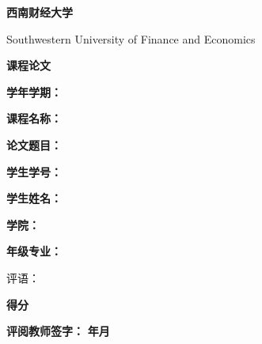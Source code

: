 \documentclass{ctexart}
\newcommand{\hwxw}{\CJKfamily{hwxw}}
\begin{document}
    \thispagestyle{empty}
    \begin{center}
        {\bfseries\hwxw 西南财经大学}

        {\BrushScriptMT Southwestern University of Finance and Economics}

        {\bfseries\heiti 课程论文}

        {\fangsong{}
            \textbf{学年学期：}\uline{\hspace{1em}\hfill} \makebox[0.46em]{}\par
            \textbf{课程名称：}\uline{\hspace{1em}\hfill} \makebox[0.46em]{}\par
            \textbf{论文题目：}\uline{\hspace{1em}\hfill} \makebox[0.46em]{}\par
            \textbf{学生学号：}\uline{\hspace{1em}\hfill} \makebox[0.46em]{}\par
            \textbf{学生姓名：}\uline{\hspace{1em}\hfill} \makebox[0.46em]{}\par
            \textbf{学\hspace{2em}院：}\uline{\hspace{1em}\hfill} \makebox[0.46em]{}\par
            \textbf{年级专业：}\uline{\hspace{1em}\hfill} \makebox[0.46em]{}\par
        }
    \end{center}
    {评语：}

    {\bfseries 得\hspace{1em}分}

    {\bfseries 评阅教师签字：}
    {\bfseries 年\quad 月}
\end{document}
